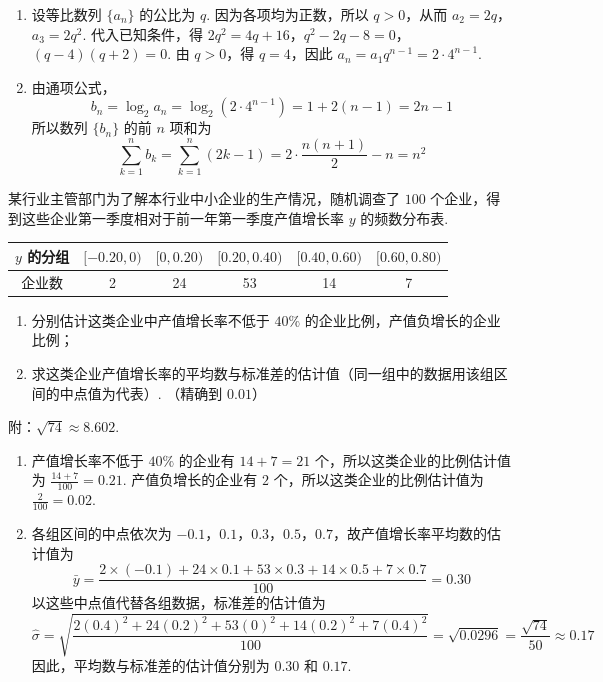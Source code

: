 \begin{solution}
\begin{enumerate}
\item 设等比数列 \(\{a_n\}\) 的公比为 \(q\). 因为各项均为正数，所以 \(q>0\)，从而
\(a_2=2q\)，\(a_3=2q^2\).
代入已知条件，得
\(2q^2=4q+16\)，\(q^2-2q-8=0\)，\((q-4)(q+2)=0\).
由 \(q>0\)，得 \(q=4\)，因此
\(a_n=a_1q^{n-1}=2\cdot4^{n-1}\).

\item 由通项公式，
\[
b_n=\log_2a_n=\log_2\left(2\cdot4^{n-1}\right)=1+2(n-1)=2n-1
\]
所以数列 \(\{b_n\}\) 的前 \(n\) 项和为
\[
\sum_{k=1}^{n}b_k=\sum_{k=1}^{n}(2k-1)=2\cdot\frac{n(n+1)}{2}-n=n^2
\]
\end{enumerate}
\end{solution}

\begin{problem}
某行业主管部门为了解本行业中小企业的生产情况，随机调查了 \(100\) 个企业，得到这些企业第一季度相对于前一年第一季度产值增长率 \(y\) 的频数分布表.

\begin{center}
\begin{tabular}{c|ccccc}
\hline
\(y\) 的分组 & \([-0.20,0)\) & \([0,0.20)\) & \([0.20,0.40)\) & \([0.40,0.60)\) & \([0.60,0.80)\)\\
\hline
企业数 & 2 & 24 & 53 & 14 & 7\\
\hline
\end{tabular}
\end{center}

\begin{enumerate}
\item 分别估计这类企业中产值增长率不低于 \(40\%\) 的企业比例，产值负增长的企业比例；
\item 求这类企业产值增长率的平均数与标准差的估计值（同一组中的数据用该组区间的中点值为代表）. （精确到 \(0.01\)）
\end{enumerate}

附：\(\sqrt{74}\approx 8.602\).
\end{problem}

\begin{solution}
\begin{enumerate}
\item 产值增长率不低于 \(40\%\) 的企业有 \(14+7=21\) 个，所以这类企业的比例估计值为
\(\frac{14+7}{100}=0.21\). 产值负增长的企业有 \(2\) 个，所以这类企业的比例估计值为 \(\frac{2}{100}=0.02\).

\item 各组区间的中点依次为 \(-0.1\)，\(0.1\)，\(0.3\)，\(0.5\)，\(0.7\)，故产值增长率平均数的估计值为
\[
\bar y=\frac{2\times(-0.1)+24\times0.1+53\times0.3+14\times0.5+7\times0.7}{100}=0.30
\]
以这些中点值代替各组数据，标准差的估计值为
\[
\hat\sigma=\sqrt{\frac{2(0.4)^2+24(0.2)^2+53(0)^2+14(0.2)^2+7(0.4)^2}{100}}=\sqrt{0.0296}=\frac{\sqrt{74}}{50}\approx0.17
\]
因此，平均数与标准差的估计值分别为 \(0.30\) 和 \(0.17\).
\end{enumerate}
\end{solution}

